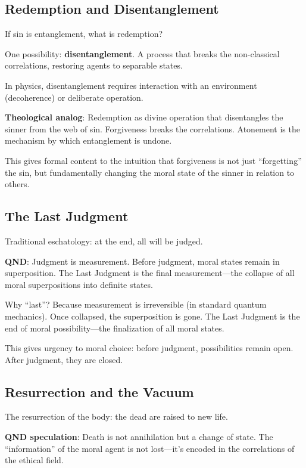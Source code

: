\documentclass[12pt]{article}
\begin{document}
\subsection{Redemption and Disentanglement}

If sin is entanglement, what is redemption?

One possibility: \textbf{disentanglement}. A process that breaks the non-classical correlations, restoring agents to separable states.

In physics, disentanglement requires interaction with an environment (decoherence) or deliberate operation.

\textbf{Theological analog}: Redemption as divine operation that disentangles the sinner from the web of sin. Forgiveness breaks the correlations. Atonement is the mechanism by which entanglement is undone.

This gives formal content to the intuition that forgiveness is not just ``forgetting'' the sin, but fundamentally changing the moral state of the sinner in relation to others.

\subsection{The Last Judgment}

Traditional eschatology: at the end, all will be judged.

\textbf{QND}: Judgment is measurement. Before judgment, moral states remain in superposition. The Last Judgment is the final measurement---the collapse of all moral superpositions into definite states.

Why ``last''? Because measurement is irreversible (in standard quantum mechanics). Once collapsed, the superposition is gone. The Last Judgment is the end of moral possibility---the finalization of all moral states.

This gives urgency to moral choice: before judgment, possibilities remain open. After judgment, they are closed.

\subsection{Resurrection and the Vacuum}

The resurrection of the body: the dead are raised to new life.

\textbf{QND speculation}: Death is not annihilation but a change of state. The ``information'' of the moral agent is not lost---it's encoded in the correlations of the ethical field.
\end{document}
